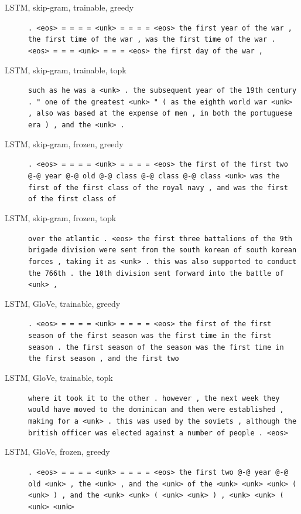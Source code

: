 \begin{description}
\item[LSTM, skip-gram, trainable, greedy] \texttt{\small . \textless{}eos\textgreater{} = = = = \textless{}unk\textgreater{} = = = = \textless{}eos\textgreater{} the first year of the war , the first time of the war , was the first time of the war . \textless{}eos\textgreater{} = = = \textless{}unk\textgreater{} = = = \textless{}eos\textgreater{} the first day of the war ,}
\item[LSTM, skip-gram, trainable, topk] \texttt{\small such as he was a \textless{}unk\textgreater{} . the subsequent year of the 19th century . " one of the greatest \textless{}unk\textgreater{} " ( as the eighth world war \textless{}unk\textgreater{} , also was based at the expense of men , in both the portuguese era ) , and the \textless{}unk\textgreater{} .}
\item[LSTM, skip-gram, frozen, greedy] \texttt{\small . \textless{}eos\textgreater{} = = = = \textless{}unk\textgreater{} = = = = \textless{}eos\textgreater{} the first of the first two @-@ year @-@ old @-@ class @-@ class @-@ class \textless{}unk\textgreater{} was the first of the first class of the royal navy , and was the first of the first class of}
\item[LSTM, skip-gram, frozen, topk] \texttt{\small over the atlantic . \textless{}eos\textgreater{} the first three battalions of the 9th brigade division were sent from the south korean of south korean forces , taking it as \textless{}unk\textgreater{} . this was also supported to conduct the 766th . the 10th division sent forward into the battle of \textless{}unk\textgreater{} ,}
\item[LSTM, GloVe, trainable, greedy] \texttt{\small . \textless{}eos\textgreater{} = = = = \textless{}unk\textgreater{} = = = = \textless{}eos\textgreater{} the first of the first season of the first season was the first time in the first season . the first season of the season was the first time in the first season , and the first two}
\item[LSTM, GloVe, trainable, topk] \texttt{\small where it took it to the other . however , the next week they would have moved to the dominican and then were established , making for a \textless{}unk\textgreater{} . this was used by the soviets , although the british officer was elected against a number of people . \textless{}eos\textgreater{}}
\item[LSTM, GloVe, frozen, greedy] \texttt{\small . \textless{}eos\textgreater{} = = = = \textless{}unk\textgreater{} = = = = \textless{}eos\textgreater{} the first two @-@ year @-@ old \textless{}unk\textgreater{} , the \textless{}unk\textgreater{} , and the \textless{}unk\textgreater{} of the \textless{}unk\textgreater{} \textless{}unk\textgreater{} \textless{}unk\textgreater{} ( \textless{}unk\textgreater{} ) , and the \textless{}unk\textgreater{} \textless{}unk\textgreater{} ( \textless{}unk\textgreater{} \textless{}unk\textgreater{} ) , \textless{}unk\textgreater{} \textless{}unk\textgreater{} ( \textless{}unk\textgreater{} \textless{}unk\textgreater{}}

\end{description}
